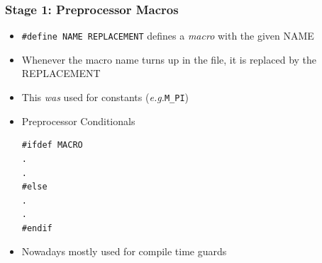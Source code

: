 \documentclass{slides}
\newcommand{\eg}{\textit{e.\thinspace g.}\xspace}
\begin{document}
\begin{frame}[fragile]
  \frametitle{Stage 1: Preprocessor Macros}
  \begin{itemize}
  \item \lstinline!#define NAME REPLACEMENT! defines a
    \emph{macro} with the given NAME
  \item Whenever the macro name turns up in the file, it is replaced
    by the REPLACEMENT
  \item This \emph{was} used for constants (\eg \lstinline!M_PI!)
  \item Preprocessor Conditionals
    \begin{lstlisting}
#ifdef MACRO
.
.
#else
.
.
#endif
    \end{lstlisting}
  \item Nowadays mostly used for compile time guards
  \end{itemize}
\end{frame}
\end{document}
